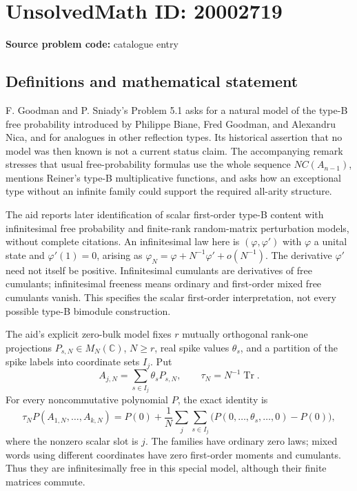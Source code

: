 \documentclass[11pt]{article}
\newcommand{\C}{\mathbb{C}}
\begin{document}
\section*{UnsolvedMath ID: 20002719}
\textbf{Source problem code:} catalogue entry
\subsection{Definitions and mathematical statement}
F. Goodman and P. Sniady's Problem 5.1 asks for a natural model of the type-B free probability introduced by Philippe Biane, Fred Goodman, and Alexandru Nica, and for analogues in other reflection types. Its historical assertion that no model was then known is not a current status claim. The accompanying remark stresses that usual free-probability formulas use the whole sequence \(NC(A_{n-1})\), mentions Reiner's type-B multiplicative functions, and asks how an exceptional type without an infinite family could support the required all-arity structure.

The aid reports later identification of scalar first-order type-B content with infinitesimal free probability and finite-rank random-matrix perturbation models, without complete citations. An infinitesimal law here is \((\varphi,\varphi')\) with \(\varphi\) a unital state and \(\varphi'(1)=0\), arising as \(\varphi_N=\varphi+N^{-1}\varphi'+o(N^{-1})\). The derivative \(\varphi'\) need not itself be positive. Infinitesimal cumulants are derivatives of free cumulants; infinitesimal freeness means ordinary and first-order mixed free cumulants vanish. This specifies the scalar first-order interpretation, not every possible type-B bimodule construction.

The aid's explicit zero-bulk model fixes \(r\) mutually orthogonal rank-one projections \(P_{s,N}\in M_N(\C)\), \(N\ge r\), real spike values \(\theta_s\), and a partition of the spike labels into coordinate sets \(I_j\). Put
\[
 A_{j,N}=\sum_{s\in I_j}\theta_sP_{s,N},\qquad\tau_N=N^{-1}\operatorname{Tr}.
\]
For every noncommutative polynomial \(P\), the exact identity is
\[
 \tau_NP(A_{1,N},\ldots,A_{k,N})
 =P(0)+\frac1N\sum_j\sum_{s\in I_j}
 \bigl(P(0,\ldots,\theta_s,\ldots,0)-P(0)\bigr),
\]
where the nonzero scalar slot is \(j\). The families have ordinary zero laws; mixed words using different coordinates have zero first-order moments and cumulants. Thus they are infinitesimally free in this special model, although their finite matrices commute.
\end{document}
